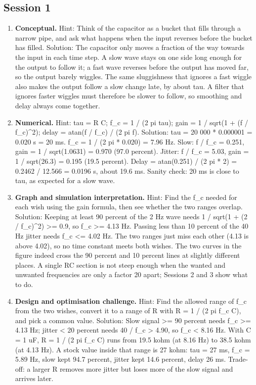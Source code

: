 \documentclass[11pt,a4paper]{article}
\begin{document}
\subsection*{Session 1}
\begin{enumerate}[nosep]
\item \textbf{Conceptual.} Hint: Think of the capacitor as a bucket that fills through a narrow pipe, and ask what happens when the input reverses before the bucket has filled. Solution: The capacitor only moves a fraction of the way towards the input in each time step. A slow wave stays on one side long enough for the output to follow it; a fast wave reverses before the output has moved far, so the output barely wiggles. The same sluggishness that ignores a fast wiggle also makes the output follow a slow change late, by about tau. A filter that ignores faster wiggles must therefore be slower to follow, so smoothing and delay always come together.
\item \textbf{Numerical.} Hint: tau = R C; f\_c = 1 / (2 pi tau); gain = 1 / sqrt(1 + (f / f\_c)\textasciicircum{}2); delay = atan(f / f\_c) / (2 pi f). Solution: tau = 20 000 * 0.000001 = 0.020 s = 20 ms. f\_c = 1 / (2 pi * 0.020) = 7.96 Hz. Slow: f / f\_c = 0.251, gain = 1 / sqrt(1.0631) = 0.970 (97.0 percent). Jitter: f / f\_c = 5.03, gain = 1 / sqrt(26.3) = 0.195 (19.5 percent). Delay = atan(0.251) / (2 pi * 2) = 0.2462 / 12.566 = 0.0196 s, about 19.6 ms. Sanity check: 20 ms is close to tau, as expected for a slow wave.
\item \textbf{Graph and simulation interpretation.} Hint: Find the f\_c needed for each wish using the gain formula, then see whether the two ranges overlap. Solution: Keeping at least 90 percent of the 2 Hz wave needs 1 / sqrt(1 + (2 / f\_c)\textasciicircum{}2) \textgreater{}= 0.9, so f\_c \textgreater{}= 4.13 Hz. Passing less than 10 percent of the 40 Hz jitter needs f\_c \textless{}= 4.02 Hz. The two ranges just miss each other (4.13 is above 4.02), so no time constant meets both wishes. The two curves in the figure indeed cross the 90 percent and 10 percent lines at slightly different places. A single RC section is not steep enough when the wanted and unwanted frequencies are only a factor 20 apart; Sessions 2 and 3 show what to do.
\item \textbf{Design and optimisation challenge.} Hint: Find the allowed range of f\_c from the two wishes, convert it to a range of R with R = 1 / (2 pi f\_c C), and pick a common value. Solution: Slow signal \textgreater{}= 90 percent needs f\_c \textgreater{}= 4.13 Hz; jitter \textless{} 20 percent needs 40 / f\_c \textgreater{} 4.90, so f\_c \textless{} 8.16 Hz. With C = 1 uF, R = 1 / (2 pi f\_c C) runs from 19.5 kohm (at 8.16 Hz) to 38.5 kohm (at 4.13 Hz). A stock value inside that range is 27 kohm: tau = 27 ms, f\_c = 5.89 Hz, slow kept 94.7 percent, jitter kept 14.6 percent, delay 26 ms. Trade-off: a larger R removes more jitter but loses more of the slow signal and arrives later.
\end{enumerate}
\end{document}

